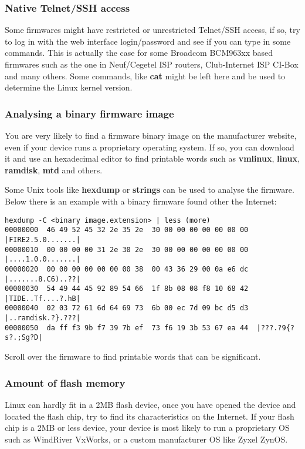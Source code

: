 \subsubsection{Native Telnet/SSH access}

Some firmwares might have restricted or unrestricted Telnet/SSH access, if so,
try to log in with the web interface login/password and see if you can type in 
some commands. This is actually the case for some Broadcom BCM963xx based firmwares
such as the one in Neuf/Cegetel ISP routers, Club-Internet ISP CI-Box and many 
others. Some commands, like \textbf{cat} might be left here and be used to 
determine the Linux kernel version.

\subsubsection{Analysing a binary firmware image}

You are very likely to find a firmware binary image on the manufacturer website,
even if your device runs a proprietary operating system. If so, you can download
it and use an hexadecimal editor to find printable words such as \textbf{vmlinux},
\textbf{linux}, \textbf{ramdisk}, \textbf{mtd} and others.

Some Unix tools like \textbf{hexdump} or \textbf{strings} can be used to analyse 
the firmware. Below there is an example with a binary firmware found other the Internet:

\begin{verbatim}
hexdump -C <binary image.extension> | less (more)
00000000  46 49 52 45 32 2e 35 2e  30 00 00 00 00 00 00 00  |FIRE2.5.0.......|
00000010  00 00 00 00 31 2e 30 2e  30 00 00 00 00 00 00 00  |....1.0.0.......|
00000020  00 00 00 00 00 00 00 38  00 43 36 29 00 0a e6 dc  |.......8.C6)..??|
00000030  54 49 44 45 92 89 54 66  1f 8b 08 08 f8 10 68 42  |TIDE..Tf....?.hB|
00000040  02 03 72 61 6d 64 69 73  6b 00 ec 7d 09 bc d5 d3  |..ramdisk.?}.???|
00000050  da ff f3 9b f7 39 7b ef  73 f6 19 3b 53 67 ea 44  |???.?9{?s?.;Sg?D|
\end{verbatim}

Scroll over the firmware to find printable words that can be significant.

\subsubsection{Amount of flash memory}

Linux can hardly fit in a 2MB flash device, once you have opened the device and 
located the flash chip, try to find its characteristics on the Internet. If
your flash chip is a 2MB or less device, your device is most likely to run a 
proprietary OS such as WindRiver VxWorks, or a custom manufacturer OS like Zyxel ZynOS.

